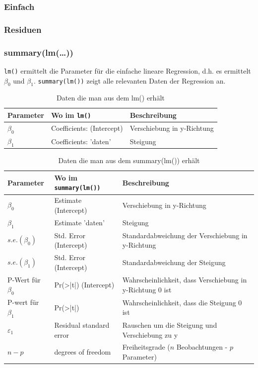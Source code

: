 \subsubsection{Einfach}

\subsubsection{Residuen}

\subsubsection{summary(lm(\dots))}
\verb!lm()! ermittelt die Parameter für die einfache lineare Regression, d.h.
es ermittelt $\beta_0$ und $\beta_1$.
\verb!summary(lm())! zeigt alle relevanten Daten der Regression an.
\begin{table}[h!]
	\centering
	\begin{tabular}{l|l|l}
	Parameter & Wo im \verb!lm()! & Beschreibung\\
	\hline
	$\beta_0$ & Coefficients: (Intercept) & Verschiebung in y-Richtung \\
	$\beta_1$ & Coefficients: 'daten' & Steigung \\
	\end{tabular}
	\caption{Daten die man aus dem lm() erhält}
\end{table}

\begin{table}[h!]
	\centering
	\begin{tabular}{l|l|p{}}
	Parameter & Wo im \verb!summary(lm())! & Beschreibung\\
	\hline
	$\beta_0$ & Estimate (Intercept) & Verschiebung in y-Richtung \\
	$\beta_1$ & Estimate 'daten' & Steigung \\
	$s.e.(\beta_0)$ & Std. Error (Intercept) & Standardabweichung der Verschiebung in y-Richtung\\
	$s.e.(\beta_1)$ & Std. Error (Intercept) & Standardabweichung der Steigung\\
	P-Wert für $\beta_0$ & Pr(>|t|) (Intercept) & Wahrscheinlichkeit, dass Verschiebung in y-Richtung 0 ist \\
	P-wert für $\beta_1$ & Pr(>|t|) & Wahrscheinlichkeit, dass die Steigung 0 ist\\
	$\varepsilon_1$ & Residual standard error & Rauschen um die Steigung und Verschiebung zu y\\
	$n-p$ & degrees of freedom & Freiheitsgrade ($n$ Beobachtungen - $p$ Parameter)\\
	\end{tabular}
	\caption{Daten die man aus dem summary(lm()) erhält}
\end{table}


